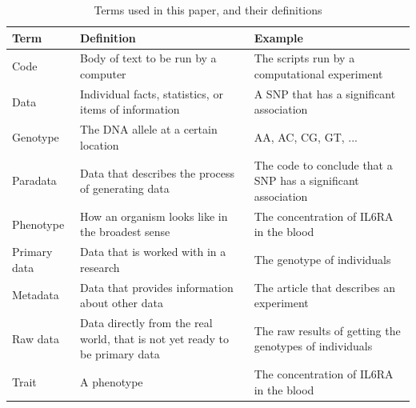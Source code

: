 \begin{table}[h]
  \begin{tabular}{lp{5cm}p{5cm}}
    Term      & Definition                                            & Example                                                         \\
    \hline
    Code      & Body of text to be run by a computer                  & The scripts run by a computational experiment                   \\
    Data      & Individual facts, statistics, or items of information & A SNP that has a significant association                        \\
    Genotype  & The DNA allele at a certain location                  & AA, AC, CG, GT, ...                                             \\
    Paradata  & Data that describes the process of generating data    & The code to conclude that a SNP has a significant association   \\
    Phenotype & How an organism looks like in the broadest sense      & The concentration of IL6RA in the blood                         \\
    Primary data & Data that is worked with in a research             & The genotype of individuals   \\
    Metadata  & Data that provides information about other data       & The article that describes an experiment                        \\
    Raw data  & Data directly from the real world, that is not yet ready to be primary data & The raw results of getting the genotypes of individuals   \\
    Trait     & A phenotype                                           & The concentration of IL6RA in the blood                         
  \end{tabular}
  \caption{Terms used in this paper, and their definitions}
  \label{tab:definitions}
\end{table}
